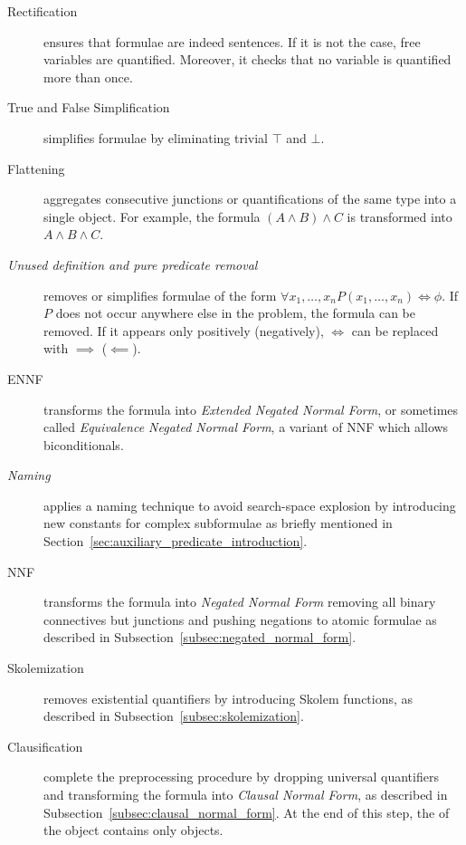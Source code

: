 \begin{description}
  \item[Rectification]  ensures that formulae are indeed sentences.
                        If it is not the case, free variables are quantified.
                        Moreover, it checks that no variable is quantified more than once.
  \item[True and False Simplification] simplifies formulae by eliminating trivial \(\top\) and \(\bot\).
  \item[Flattening] aggregates consecutive junctions or quantifications of the same type into a single object.
                    For example, the formula \((A \land B) \land C\) is transformed into \(A \land B \land C \).
  \item[\emph{Unused definition and pure predicate removal}]  removes or simplifies formulae of the form \(\forall x_1,\ldots,x_n P(x_1, \ldots,x_n) \iff \phi\).
                                                              If \(P\) does not occur anywhere else in the problem, the formula can be removed.
                                                              If it appears only positively (negatively), \(\iff\) can be replaced with \(\implies\) (\(\impliedby\)).
  \item[ENNF] transforms the formula into \emph{Extended Negated Normal Form}, or sometimes called \emph{Equivalence Negated Normal Form}, a variant of NNF which allows biconditionals.
  \item[\emph{Naming}] applies a naming technique to avoid search-space explosion by introducing new constants for complex subformulae as briefly mentioned in Section~\ref{sec:auxiliary_predicate_introduction}.
  \item[NNF] transforms the formula into \emph{Negated Normal Form} removing all binary connectives but junctions and pushing negations to atomic formulae as described in Subsection~\ref{subsec:negated_normal_form}.
  \item[Skolemization] removes existential quantifiers by introducing Skolem functions, as described in Subsection~\ref{subsec:skolemization}.
  \item[Clausification] complete the preprocessing procedure by dropping universal quantifiers and transforming the formula into \emph{Clausal Normal Form}, as described in Subsection~\ref{subsec:clausal_normal_form}.
                        At the end of this step, the  of the  object contains only  objects.
\end{description}



